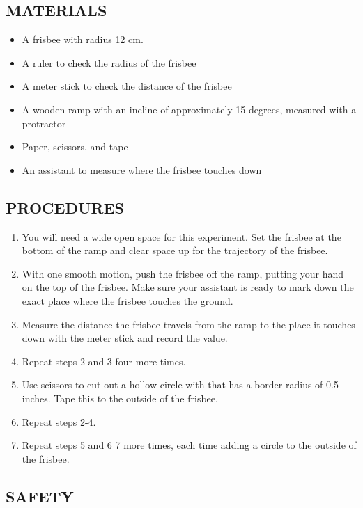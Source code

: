 \documentclass{article}
\begin{document}
\subsection{MATERIALS}\label{materials}

\begin{itemize}
\tightlist
\item
  A frisbee with radius 12 cm.
\item
  A ruler to check the radius of the frisbee
\item
  A meter stick to check the distance of the frisbee
\item
  A wooden ramp with an incline of approximately 15 degrees, measured
  with a protractor
\item
  Paper, scissors, and tape
\item
  An assistant to measure where the frisbee touches down
\end{itemize}

\subsection{PROCEDURES}\label{procedures}

\begin{enumerate}
\def\labelenumi{\arabic{enumi}.}
\tightlist
\item
  You will need a wide open space for this experiment. Set the frisbee
  at the bottom of the ramp and clear space up for the trajectory of the
  frisbee.
\item
  With one smooth motion, push the frisbee off the ramp, putting your
  hand on the top of the frisbee. Make sure your assistant is ready to
  mark down the exact place where the frisbee touches the ground.
\item
  Measure the distance the frisbee travels from the ramp to the place it
  touches down with the meter stick and record the value.
\item
  Repeat steps 2 and 3 four more times.
\item
  Use scissors to cut out a hollow circle with that has a border radius
  of 0.5 inches. Tape this to the outside of the frisbee.
\item
  Repeat steps 2-4.
\item
  Repeat steps 5 and 6 7 more times, each time adding a circle to the
  outside of the frisbee.
\end{enumerate}

\subsection{SAFETY}\label{safety}
\end{document}
